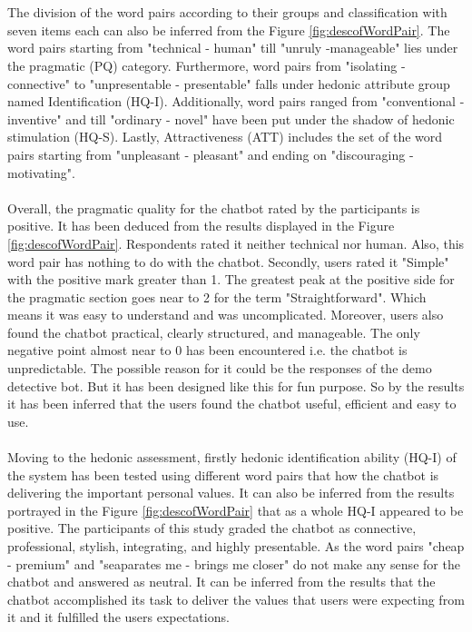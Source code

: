 \\~\\
The division of the word pairs according to their groups and classification with seven items each can also be inferred from the Figure \ref{fig:descofWordPair}. The word pairs starting from "technical - human" till "unruly -manageable" lies under the pragmatic (PQ) category. Furthermore, word pairs from "isolating - connective" to "unpresentable - presentable" falls under hedonic attribute group named Identification (HQ-I). Additionally, word pairs ranged from "conventional - inventive" and till "ordinary - novel" have been put under the shadow of hedonic stimulation (HQ-S). Lastly, Attractiveness (ATT) includes the set of the word pairs starting from "unpleasant - pleasant" and ending on "discouraging - motivating". 
\\~\\
Overall, the pragmatic quality for the chatbot rated by the participants is positive. It has been deduced from the results displayed in the Figure \ref{fig:descofWordPair}. Respondents rated it neither technical nor human. Also, this word pair has nothing to do with the chatbot. Secondly, users rated it "Simple" with the positive mark greater than 1. The greatest peak at the positive side for the pragmatic section goes near to 2 for the term "Straightforward". Which means it was easy to understand and was uncomplicated. Moreover, users also found the chatbot practical, clearly structured, and manageable. The only negative point almost near to 0 has been encountered i.e. the chatbot is unpredictable. The possible reason for it could be the responses of the demo detective bot. But it has been designed like this for fun purpose. So by the results it has been inferred that the users found the chatbot useful, efficient and easy to use.
\\~\\
Moving to the hedonic assessment, firstly hedonic identification ability (HQ-I) of the system has been tested using different word pairs that how the chatbot is delivering the important personal values. It can also be inferred from the results portrayed in the Figure \ref{fig:descofWordPair} that as a whole HQ-I appeared to be positive. The participants of this study graded the chatbot as connective, professional, stylish, integrating, and highly presentable. As the word pairs "cheap - premium" and "seaparates me - brings me closer" do not make any sense for the chatbot and answered as neutral. It can be inferred from the results that the chatbot accomplished its task to deliver the values that users were expecting from it and it fulfilled the users expectations. 
